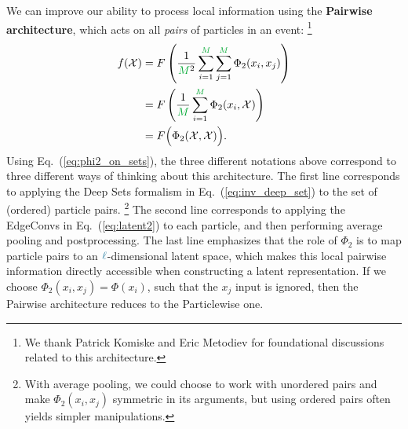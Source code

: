 \documentclass[aps,prd,twocolumn,superscriptaddress,floatfix,longbibliography,preprintnumbers,nofootinbib]{revtex4-1} %
\DeclareRobustCommand{\Eq}[1]{Eq.~(\ref{eq:#1})}
\begin{document}
          
          We can improve our ability to process local information using the \textbf{Pairwise architecture}, which acts on all \textit{pairs} of particles in an event:%
          \footnote{We thank Patrick Komiske and Eric Metodiev for foundational discussions related to this architecture.}
          \begin{align}
        \nonumber
	f(\mathcal X) & = F\left(\frac{1}{{\color{c2} M}^2} \sum_{i=1}^{{\color{c2} M}}\sum_{j=1}^{{\color{c2} M}}\Phi_2(x_i,x_j) \right)\\
      \nonumber &= F\left( \frac{1}{{\color{c2}M}}\sum_{i=1}^{{\color{c2}M}} \Phi_2(x_i,\mathcal X) \right) \\
        &= F \Big( \Phi_2(\mathcal X,\mathcal X)\Big).
        \label{eq:pairwise_arch} 
      \end{align}
          Using \Eq{phi2_on_sets}, the three different notations above correspond to three different ways of thinking about this architecture.
          The first line corresponds to applying the Deep Sets formalism in \Eq{inv_deep_set} to the set of (ordered) particle pairs.%
          \footnote{With average pooling, we could choose to work with unordered pairs and make $\Phi_2(x_i,x_j)$ symmetric in its arguments, but using ordered pairs often yields simpler manipulations.}
          The second line corresponds to applying the EdgeConvs in \Eq{latent2} to each particle, and then performing average pooling and postprocessing.
          The last line emphasizes that the role of $\Phi_2$ is to map particle pairs to an \({\color{c3}\ell}\)-dimensional latent space, which makes this local pairwise information directly accessible when constructing a latent representation.
          If we choose $\Phi_2(x_i,x_j)=\Phi(x_i)$, such that the $x_j$ input is ignored, then the Pairwise architecture reduces to the Particlewise one.
          
\end{document}
